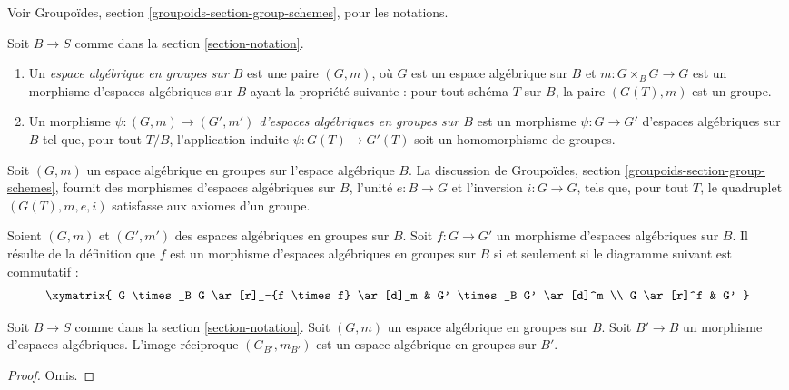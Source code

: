 \noindent
Voir Groupoïdes, section \ref{groupoids-section-group-schemes}, pour les notations.

\begin{definition}
\label{definition-group-space}
Soit $B \to S$ comme dans la section \ref{section-notation}.
\begin{enumerate}
\item Un {\it espace algébrique en groupes sur $B$} est une paire $(G, m)$, où $G$ est un espace algébrique sur $B$ et $m : G \times_B G \to G$ est un morphisme d'espaces algébriques sur $B$ ayant la propriété suivante : pour tout schéma $T$ sur $B$, la paire $(G(T), m)$ est un groupe.
\item Un morphisme {\it $\psi : (G, m) \to (G', m')$ d'espaces algébriques en groupes sur $B$} est un morphisme $\psi : G \to G'$ d'espaces algébriques sur $B$ tel que, pour tout $T/B$, l'application induite $\psi : G(T) \to G'(T)$ soit un homomorphisme de groupes.
\end{enumerate}
\end{definition}

\noindent
Soit $(G, m)$ un espace algébrique en groupes sur l'espace algébrique $B$. La discussion de Groupoïdes, section \ref{groupoids-section-group-schemes}, fournit des morphismes d'espaces algébriques sur $B$, l'unité $e : B \to G$ et l'inversion $i : G \to G$, tels que, pour tout $T$, le quadruplet $(G(T), m, e, i)$ satisfasse aux axiomes d'un groupe.

\medskip\noindent
Soient $(G, m)$ et $(G', m')$ des espaces algébriques en groupes sur $B$. Soit $f : G \to G'$ un morphisme d'espaces algébriques sur $B$. Il résulte de la définition que $f$ est un morphisme d'espaces algébriques en groupes sur $B$ si et seulement si le diagramme suivant est commutatif :
$$
\xymatrix{
G \times_B G \ar[r]_-{f \times f} \ar[d]_m &
G' \times_B G' \ar[d]^m \\
G \ar[r]^f & G'
}
$$

\begin{lemma}
\label{lemma-base-change-group-space}
Soit $B \to S$ comme dans la section \ref{section-notation}. Soit $(G, m)$ un espace algébrique en groupes sur $B$. Soit $B' \to B$ un morphisme d'espaces algébriques. L'image réciproque $(G_{B'}, m_{B'})$ est un espace algébrique en groupes sur $B'$.
\end{lemma}

\begin{proof}
Omis.
\end{proof}








